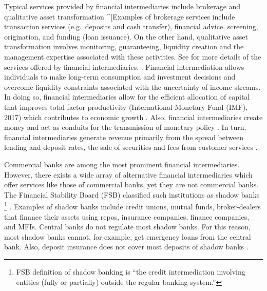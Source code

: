 \documentclass[a4paper, nobind]{templates/ociamthesis}
\begin{document}
Typical services provided by financial intermediaries include brokerage and qualitative asset transformation \^{}{[}Examples of brokerage services include transaction services (e.g.~deposits and cash transfer), financial advice, screening, origination, and funding (loan issuance). On the other hand, qualitative asset transformation involves monitoring, guaranteeing, liquidity creation and the management expertise associated with these activities. See\autocite{greenbaum2019contemporary} for more details of the services offered by financial intermediaries. \autocite{greenbaum2019contemporary,gobat2017banksmatter}. Financial intermediation allows individuals to make long-term consumption and investment decisions and overcome liquidity constraints associated with the uncertainty of income streams\autocite{greenbaum2019contemporary}. In doing so, financial intermediaries allow for the efficient allocation of capital that improves total factor productivity (International Monetary Fund (IMF), 2017) which contributes to economic growth \autocite{chen2017microfinance}. Also, financial intermediaries create money and act as conduits for the transmission of monetary policy \autocite{greenbaum2019contemporary}. In turn, financial intermediaries generate revenue primarily from the spread between lending and deposit rates, the sale of securities and fees from customer services \autocite{cosci2015role}.

Commercial banks are among the most prominent financial intermediaries. However, there exists a wide array of alternative financial intermediaries which offer services like those of commercial banks, yet they are not commercial banks. The Financial Stability Board (FSB) classified such institutions as shadow banks \footnote{FSB definition of shadow banking is ``the credit intermediation involving entities (fully or partially) outside the regular banking system.''} \autocite{board2017assessment} . Examples of shadow banks include credit unions, mutual funds, broker-dealers that finance their assets using repos, insurance companies, finance companies, and MFIs. Central banks do not regulate most shadow banks. For this reason, most shadow banks cannot, for example, get emergency loans from the central bank. Also, deposit insurance does not cover most deposits of shadow banks \autocite{kodres2017shadowbanking}.
\end{document}
